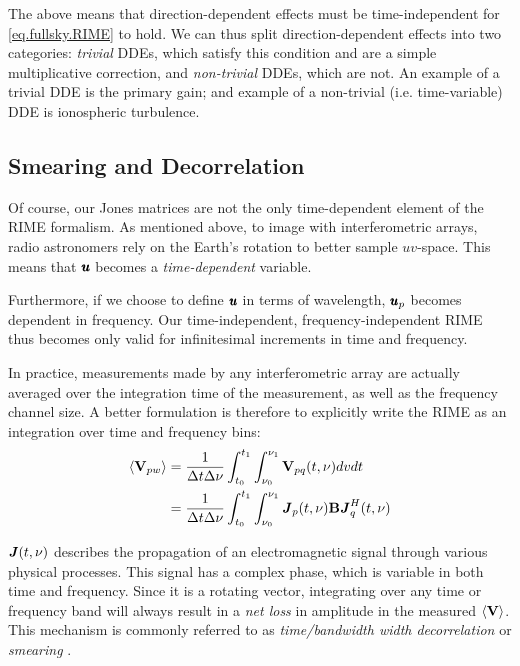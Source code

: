\pg
The above means that direction-dependent effects must be time-independent for \cref{eq.fullsky.RIME} to hold. We can thus split direction-dependent effects into two categories: \emph{trivial} DDEs, which satisfy this condition and are a simple multiplicative correction, and \emph{non-trivial} DDEs, which are not. An example of a trivial DDE is the primary gain; and example of a non-trivial (i.e. time-variable) DDE is ionospheric turbulence.

\subsection{Smearing and Decorrelation}
\label{section.RIME.TimeDep.Decoherence}

\pg
Of course, our Jones matrices are not the only time-dependent element of the RIME formalism. As mentioned above, to image with interferometric arrays, radio astronomers rely on the Earth's rotation to better sample $uv$-space. This means that $\pmb{u}$ becomes a \emph{time-dependent} variable.

\pg
Furthermore, if we choose to define $\pmb{u}$ in terms of wavelength, $\pmb{u}_p$ becomes dependent in frequency. Our time-independent, frequency-independent RIME thus becomes only valid for infinitesimal increments in time and frequency.

\pg
In practice, measurements made by any interferometric array are actually averaged over the integration time of the measurement, as well as the frequency channel size. A better formulation is therefore to explicitly write the RIME as an integration over time and frequency bins:
\begin{align}
\langle \textbf{V}_{pw} \rangle &= \frac{1}{\Delta t \Delta \nu} \int_{t_0}^{t_1} \int_{\nu_0}^{\nu_1} \textbf{V}_{pq}(t,\nu) dv dt\\
                          &= \frac{1}{\Delta t \Delta \nu} \int_{t_0}^{t_1} \int_{\nu_0}^{\nu_1} \textbf{\emph{J}}_p(t,\nu) \textbf{B} \textbf{\emph{J}}_q^H(t,\nu)
\end{align}

\pg
$\textbf{\emph{J}}(t,\nu)$ describes the propagation of an electromagnetic signal through various physical processes. This signal has a complex phase, which is variable in both time and frequency. Since it is a rotating vector, integrating over any time or frequency band will always result in a \emph{net loss} in amplitude in the measured $\langle\textbf{V}\rangle$. This mechanism is commonly referred to as \emph{time/bandwidth width decorrelation} or \emph{smearing} .

